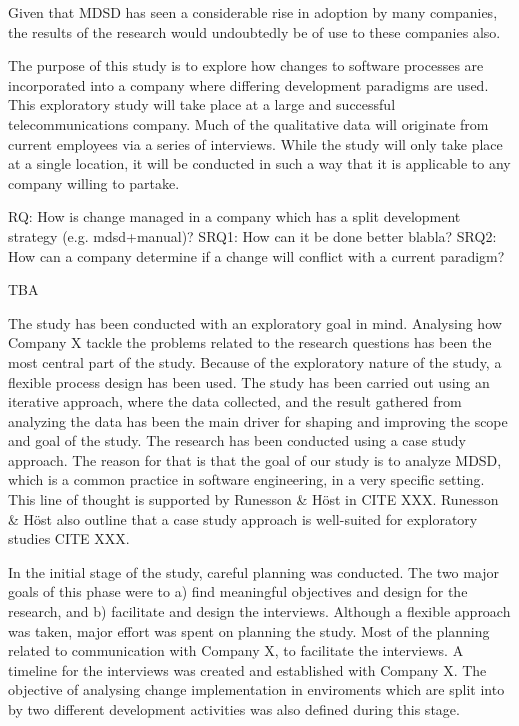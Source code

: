 \documentclass[times, 10pt,twocolumn]{IEEEtran}
\begin{document}
Given that MDSD has seen a considerable rise in adoption by many companies\cite{millermda}, the results of the research would undoubtedly be of use to these companies also.

The purpose of this study is to explore how changes to software processes are incorporated into a company where differing development paradigms are used. This exploratory study will take place at a large and successful telecommunications company. Much of the qualitative data will originate from current employees via a series of interviews. While the study will only take place at a single location, it will be conducted in such a way that it is applicable to any company willing to partake. 

RQ: How is change managed in a company which has a split development strategy (e.g. mdsd+manual)?
SRQ1: How can it be done better blabla?
SRQ2: How can a company determine if a change will conflict with a current paradigm?

TBA
\newpage



The study has been conducted with an exploratory goal in mind. Analysing how Company X tackle the problems related to the research questions has been the most central part of the study. Because of the exploratory nature of the study, a flexible process design has been used. The study has been carried out using an iterative approach, where the data collected, and the result gathered from analyzing the data has been the main driver for shaping and improving the scope and goal of the study. The research has been conducted using a case study approach. The reason for that is that the goal of our study is to analyze MDSD, which is a common practice in software engineering, in a very specific setting. This line of thought is supported by Runesson \& Höst in CITE XXX. Runesson \& Höst also outline that a case study approach is well-suited for exploratory studies CITE XXX. 

In the initial stage of the study, careful planning was conducted. The two major goals of this phase were to a) find meaningful objectives and design for the research, and b) facilitate and design the interviews. Although a flexible approach was taken, major effort was spent on planning the study. Most of the planning related to communication with Company X, to facilitate the interviews. A timeline for the interviews was created and established with Company X. The objective of analysing change implementation in enviroments which are split into by two different development activities was also defined during this stage. 
\end{document}
